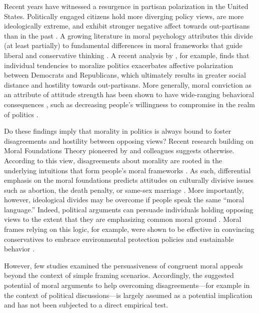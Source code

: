 Recent years have witnessed a resurgence in partisan polarization in the United States. Politically engaged citizens hold more diverging policy
views, are more ideologically extreme, and exhibit stronger negative affect towards out-partisans than in the past \citep{hetherington2001resurgent, abramowitz2008polarization, iyengar2012affect, mason2014disrespectfully, huddy2015expressive, iyengar2015fear}. A growing literature in moral psychology attributes this divide (at least partially) to fundamental differences in moral frameworks that guide liberal and conservative thinking \citep[e.g.,][]{haidt2012righteous,graham2013moral}. A recent analysis by \citet{garrett2018moral}, for example, finds that individual tendencies to moralize politics exacerbates affective polarization between Democrats and Republicans, which ultimately results in greater social distance and hostility towards out-partisans. More generally, moral conviction as an attribute of attitude strength has been shown to have wide-ranging behavioral consequences \citep{skitka2005moral,skitka2014social}, such as decreasing people's willingness to compromise in the realm of politics \citep{ryan2014reconsidering,ryan2017no}.

Do these findings imply that morality in politics is always bound to foster disagreements and hostility between opposing views? Recent research building on Moral Foundations Theory pioneered by \citet{haidt2007new} and colleagues suggests otherwise. According to this view, disagreements about morality are rooted in the underlying intuitions that form people's moral frameworks \citep{haidt2012righteous}. As such, differential emphasis on the moral foundations predicts attitudes on culturally divisive issues such as abortion, the death penalty, or same-sex marriage \citep{koleva2012tracing}. More importantly, however, ideological divides may be overcome if people speak the same ``moral language.'' Indeed, political arguments can persuade individuals holding opposing views to the extent that they are emphasizing common moral ground \citep{feinberg2015gulf}. Moral frames relying on this logic, for example, were shown to be effective in convincing conservatives to embrace environmental protection policies and sustainable behavior \citep{kidwell2013getting,feinberg2013moral}.

However, few studies examined the persuasiveness of congruent moral appeals beyond the context of simple framing scenarios. Accordingly, the suggested potential of moral arguments to help overcoming disagreements---for example in the context of political discussions---is largely assumed as a potential implication and has not been subjected to a direct empirical test.

